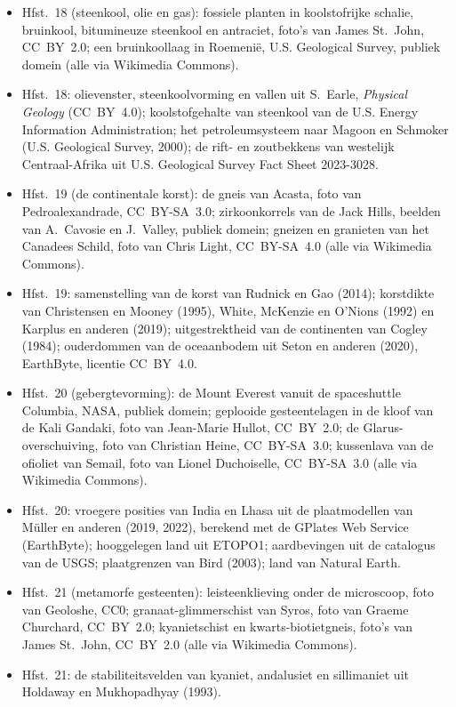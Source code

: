 \begin{itemize}
  \item Hfst.~18 (steenkool, olie en gas): fossiele planten in koolstofrijke schalie, bruinkool, bitumineuze steenkool en antraciet, foto's van James St.~John, CC~BY~2.0; een bruinkoollaag in Roemenië, U.S. Geological Survey, publiek domein (alle via Wikimedia Commons).
  \item Hfst.~18: olievenster, steenkoolvorming en vallen uit S.~Earle, \emph{Physical Geology} (CC~BY~4.0); koolstofgehalte van steenkool van de U.S. Energy Information Administration; het petroleumsysteem naar Magoon en Schmoker (U.S. Geological Survey, 2000); de rift- en zoutbekkens van westelijk Centraal-Afrika uit U.S. Geological Survey Fact Sheet 2023-3028.
  \item Hfst.~19 (de continentale korst): de gneis van Acasta, foto van Pedroalexandrade, CC~BY-SA~3.0; zirkoonkorrels van de Jack Hills, beelden van A.~Cavosie en J.~Valley, publiek domein; gneizen en granieten van het Canadees Schild, foto van Chris Light, CC~BY-SA~4.0 (alle via Wikimedia Commons).
  \item Hfst.~19: samenstelling van de korst van Rudnick en Gao (2014); korstdikte van Christensen en Mooney (1995), White, McKenzie en O'Nions (1992) en Karplus en anderen (2019); uitgestrektheid van de continenten van Cogley (1984); ouderdommen van de oceaanbodem uit Seton en anderen (2020), EarthByte, licentie CC~BY~4.0.
  \item Hfst.~20 (gebergtevorming): de Mount Everest vanuit de spaceshuttle Columbia, NASA, publiek domein; geplooide gesteentelagen in de kloof van de Kali Gandaki, foto van Jean-Marie Hullot, CC~BY~2.0; de Glarus-overschuiving, foto van Christian Heine, CC~BY-SA~3.0; kussenlava van de ofioliet van Semail, foto van Lionel Duchoiselle, CC~BY-SA~3.0 (alle via Wikimedia Commons).
  \item Hfst.~20: vroegere posities van India en Lhasa uit de plaatmodellen van Müller en anderen (2019, 2022), berekend met de GPlates Web Service (EarthByte); hooggelegen land uit ETOPO1; aardbevingen uit de catalogus van de USGS; plaatgrenzen van Bird (2003); land van Natural Earth.
  \item Hfst.~21 (metamorfe gesteenten): leisteenklieving onder de microscoop, foto van Geoloshe, CC0; granaat-glimmerschist van Syros, foto van Graeme Churchard, CC~BY~2.0; kyanietschist en kwarts-biotietgneis, foto's van James St.~John, CC~BY~2.0 (alle via Wikimedia Commons).
  \item Hfst.~21: de stabiliteitsvelden van kyaniet, andalusiet en sillimaniet uit Holdaway en Mukhopadhyay (1993).

\end{itemize}
